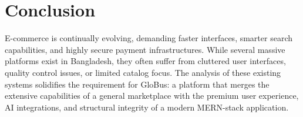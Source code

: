 \section{Conclusion}
E-commerce is continually evolving, demanding faster interfaces, smarter search capabilities, and highly secure payment infrastructures. While several massive platforms exist in Bangladesh, they often suffer from cluttered user interfaces, quality control issues, or limited catalog focus. The analysis of these existing systems solidifies the requirement for GloBus: a platform that merges the extensive capabilities of a general marketplace with the premium user experience, AI integrations, and structural integrity of a modern MERN-stack application.
